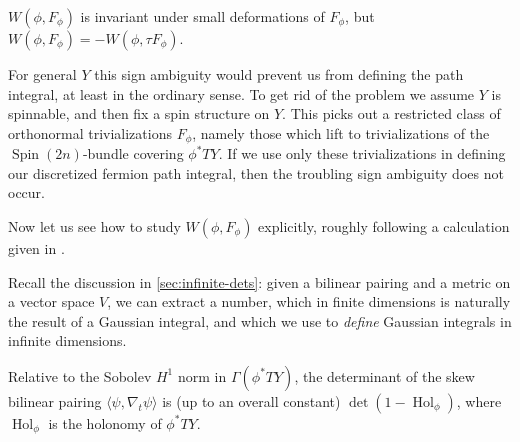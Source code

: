 \documentclass[12pt,letterpaper,reqno]{article}
\numberwithin{equation}{section}
\newcommand{\IP}[1]{\langle#1\rangle}
\newcommand{\ti}[1]{\textit{#1}}
\DeclareMathOperator{\Hol}{Hol}
\DeclareMathOperator{\Spin}{Spin}
\begin{document}
\begin{prop}
$W(\phi, F_\phi)$ is invariant under small deformations of $F_\phi$, but
$W(\phi, F_\phi) = - W(\phi, \tau F_\phi)$.
\end{prop}

For general $Y$
this sign ambiguity would prevent us from defining the path
integral, at least in the ordinary sense. To get rid of the problem
we assume $Y$ is spinnable, and then 
fix a spin structure on $Y$. This picks out a restricted class
of orthonormal trivializations $F_\phi$, namely those which lift
to trivializations of the $\Spin(2n)$-bundle covering $\phi^* TY$.
If we use only these trivializations in defining our discretized
fermion path integral, then the troubling 
sign ambiguity does not occur.

Now let us see how to study $W(\phi,F_\phi)$ explicitly,
roughly following a calculation given in
\cite{MR87i:81237,MR816738}.

Recall the discussion in \autoref{sec:infinite-dets}: given a bilinear 
pairing
and a metric on a vector space $V$, we can extract a number, which
in finite dimensions is naturally the result of a Gaussian integral,
and which we use to \ti{define} Gaussian integrals in infinite
dimensions.

\begin{prop} \label{prop:regularized-det-fermion}
Relative to the Sobolev $H^1$ norm in $\Gamma(\phi^* TY)$,
the determinant of the skew bilinear pairing $\IP{\psi, \nabla_t \psi}$
is (up to an overall constant)
$\det(1 - \Hol_\phi)$, where $\Hol_\phi$ is the
holonomy of $\phi^* TY$.
\end{prop}
\end{document}
